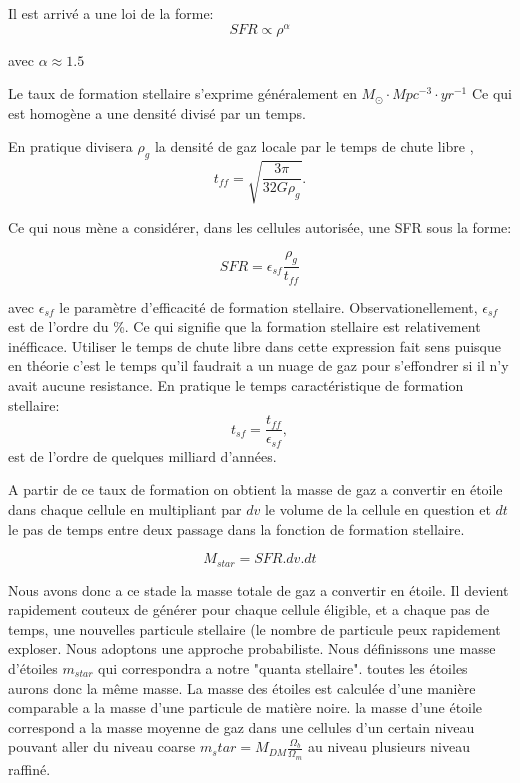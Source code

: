Il est arrivé a une loi de la forme:
\begin{equation}
SFR \propto \rho ^{\alpha}
\end{equation}

avec $\alpha \approx 1.5$

 
Le taux de formation stellaire s'exprime généralement en $M_\odot \cdot Mpc^{-3}  \cdot yr^{-1}$  
Ce qui est homogène a une densité divisé par un temps.


En pratique divisera $\rho_g$ la densité de gaz locale par le temps de chute libre ,
\begin{equation}
t_{ff} = \sqrt{\frac{3\pi}{32G\rho_g}}.
\end{equation}

Ce qui nous mène a considérer, dans les cellules autorisée, une SFR sous la forme:

\begin{equation}
	SFR = \epsilon_{sf} \frac{\rho_g}{t_{ff}}
    \label{eq_sfr}
\end{equation}

avec  $\epsilon_{sf}$ le paramètre d'efficacité de formation stellaire.
Observationellement, $\epsilon_{sf}$  est de l'ordre du \%. %
Ce qui signifie que la formation stellaire est relativement inéfficace.
Utiliser le temps de chute libre dans cette expression fait sens puisque en théorie c'est le temps qu'il faudrait a un nuage de gaz pour s'effondrer si il n'y avait aucune resistance.
En pratique le temps caractéristique de formation stellaire:
\begin{equation}
t_{sf} =  \frac{t_{ff}}{ \epsilon_{sf} },
\end{equation}
est de l'ordre de quelques milliard d'années.

A partir de ce taux de formation on obtient la masse de gaz a convertir en étoile dans chaque cellule en multipliant par $dv$ le volume de la cellule en question et $dt$ le pas de temps entre deux passage dans la fonction de formation stellaire.

\begin{equation}
	M_{star} = SFR . dv .dt 
\end{equation}


Nous avons donc a ce stade la masse totale de gaz a convertir en étoile.
Il devient rapidement couteux de générer pour chaque cellule éligible, et a chaque pas de temps, une nouvelles particule stellaire (le nombre de particule peux rapidement exploser.
Nous adoptons une approche probabiliste.
Nous définissons une masse d'étoiles $m_{star}$ qui correspondra a notre "quanta stellaire".
toutes les étoiles aurons donc la même masse.
La masse des étoiles est calculée d'une manière comparable a la masse d'une particule de matière noire.
la masse d'une étoile correspond a la masse moyenne de gaz dans une cellules d'un certain niveau pouvant aller du niveau coarse $m_star = M_{DM} \frac{\Omega_b}{\Omega_m}$ au niveau plusieurs niveau raffiné.


